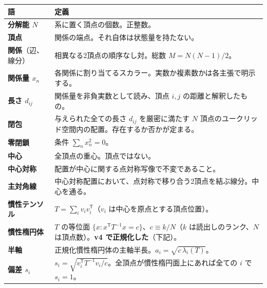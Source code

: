 \documentclass[
  10pt,
]{ltjsarticle}
\newcounter{none} %
\begin{document}
{\def\LTcaptype{none} %
\begin{longtable}[]{@{}
  >{\raggedright\arraybackslash}p{}
  >{\raggedright\arraybackslash}p{}@{}}
\toprule\noalign{}
\begin{minipage}[b]{\linewidth}\raggedright
語
\end{minipage} & \begin{minipage}[b]{\linewidth}\raggedright
定義
\end{minipage} \\
\midrule\noalign{}
\endhead
\bottomrule\noalign{}
\endlastfoot
\textbf{分解能 \(N\)} & 系に置く頂点の個数。正整数。 \\
\textbf{頂点} & 関係の端点。それ自体は状態量を持たない。 \\
\textbf{関係}（辺、線分） & 相異なる2頂点の順序なし対。総数
\(M = N(N-1)/2\)。 \\
\textbf{関係量 \(x_n\)} &
各関係に割り当てるスカラー。実数か複素数かは各主張で明示する。 \\
\textbf{長さ \(d_{ij}\)} & 関係量を非負実数として読み、頂点 \(i,j\)
の距離と解釈したもの。 \\
\textbf{閉包} & 与えられた全ての長さ \(d_{ij}\) を厳密に満たす \(N\)
頂点のユークリッド空間内の配置。存在するか否かが定まる。 \\
\textbf{零閉鎖} & 条件 \(\sum_n x_n^2 = 0\)。 \\
\textbf{中心} & 全頂点の重心。頂点ではない。 \\
\textbf{中心対称} & 配置が中心に関する点対称写像で不変であること。 \\
\textbf{主対角線} &
中心対称配置において、点対称で移り合う2頂点を結ぶ線分。中心を通る。 \\
\textbf{慣性テンソル} & \(T = \sum_i v_i v_i^{\mathsf T}\)（\(v_i\)
は中心を原点とする頂点位置）。 \\
\textbf{慣性楕円体} & \(T\) の等位面
\(\{x : x^{\mathsf T}T^{-1}x = c\}\)、\(c \equiv k/N\)（\(k\)
は読出しのランク、\(N\) は頂点数）。\textbf{v4
で正規化した}（下記）。 \\
\textbf{半軸} &
正規化慣性楕円体の主軸半長。\(a_i = \sqrt{c\,\lambda_i(T)}\)。 \\
\textbf{偏差 \(s_i\)} &
\(s_i = \sqrt{v_i^{\mathsf T}T^{-1}v_i / c}\)。全頂点が慣性楕円面上にあれば全ての
\(i\) で \(s_i = 1\)。 \\
\end{longtable}
}
\end{document}
